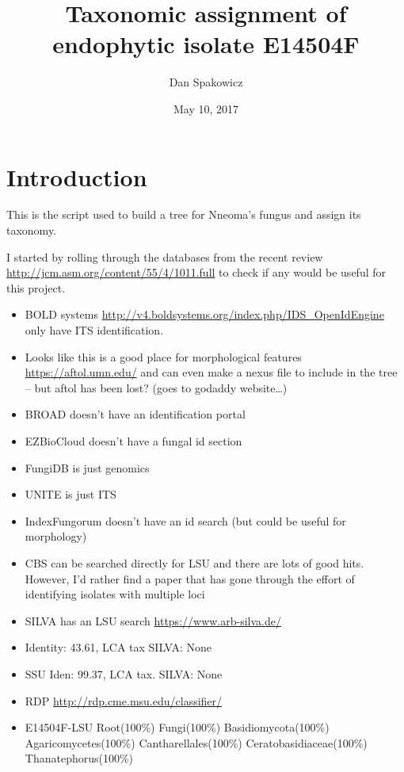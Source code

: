 \documentclass[11pt,]{article}
\title{Taxonomic assignment of endophytic isolate E14504F}
\author{Dan Spakowicz}
\date{May 10, 2017}
\providecommand{\tightlist}{%
  \setlength{\itemsep}{0pt}\setlength{\parskip}{0pt}}
\begin{document}
\maketitle

\section{Introduction}\label{introduction}

This is the script used to build a tree for Nneoma's fungus and assign
its taxonomy.

I started by rolling through the databases from the recent review
\url{http://jcm.asm.org/content/55/4/1011.full} to check if any would be
useful for this project.

\begin{itemize}
\tightlist
\item
  BOLD systems
  \url{http://v4.boldsystems.org/index.php/IDS_OpenIdEngine} only have
  ITS identification.
\item
  Looks like this is a good place for morphological features
  \url{https://aftol.umn.edu/} and can even make a nexus file to include
  in the tree -- but aftol has been lost? (goes to godaddy
  website\ldots{})
\item
  BROAD doesn't have an identification portal
\item
  EZBioCloud doesn't have a fungal id section
\item
  FungiDB is just genomics
\item
  UNITE is just ITS
\item
  IndexFungorum doesn't have an id search (but could be useful for
  morphology)
\item
  CBS can be searched directly for LSU and there are lots of good hits.
  However, I'd rather find a paper that has gone through the effort of
  identifying isolates with multiple loci
\item
  SILVA has an LSU search \url{https://www.arb-silva.de/}
\item
  Identity: 43.61, LCA tax SILVA: None
\item
  SSU Iden: 99.37, LCA tax. SILVA: None
\item
  RDP \url{http://rdp.cme.msu.edu/classifier/}
\item
  E14504F-LSU Root(100\%) Fungi(100\%) Basidiomycota(100\%)
  Agaricomycetes(100\%) Cantharellales(100\%) Ceratobasidiaceae(100\%)
  Thanatephorus(100\%)
\end{itemize}
\end{document}
